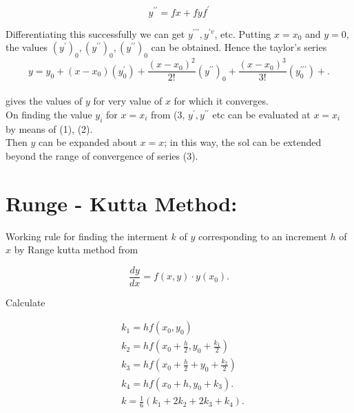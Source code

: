 \documentclass[12pt]{exam}
\begin{document}
\begin{equation*}
y^{\prime \prime}=f x+f y f^{\prime} \tag{2}
\end{equation*}


Differentiating this successfully we can get $y^{\prime \prime \prime}, y^{\prime v}$, etc. Putting $x=x_{0}$ and $y=0$, the values $\left(y^{\prime}\right)_{0},\left(y^{\prime \prime}\right)_{0},\left(y^{\prime \prime}\right)_{0}$ can be obtained. Hence the taylor's series\\


\begin{equation*}
y=y_{0}+\left(x-x_{0}\right)\left(y_{0}^{\prime}\right)+\frac{\left(x-x_{0}\right)^{2}}{2!}\left(y^{\prime \prime}\right)_{0}+\frac{\left(x-x_{0}\right)^{3}}{3!}\left(y_{0}^{\prime \prime \prime}\right)+. \tag{3}
\end{equation*}
\\[15pt]

gives the values of $y$ for very value of $x$ for which it converges.\\[15pt]
On finding the value $y_{i}$ for $x=x_{i}$ from (3, $y^{\prime}, y^{\prime \prime}$ etc can be evaluated at $x=x_{i}$ by means of (1), (2).\\[15pt]
Then $y$ can be expanded about $x=x$; in this way, the sol can be extended beyond the range of convergence of series (3).\\


\newpage


\section{Runge - Kutta Method:}
Working rule for finding the interment $k$ of $y$ corresponding to an increment $h$ of $x$ by Range kutta method from

$$
\frac{d y}{d x}=f(x, y) \cdot y\left(x_{0}\right) .
$$

Calculate

$$
\begin{aligned}
& k_{1}=h f\left(x_{0}, y_{0}\right) \\
& k_{2}=h f\left(x_{0}+\frac{h}{2}, y_{0}+\frac{k_{1}}{2}\right) \\
& k_{3}=h f\left(x_{0}+\frac{h}{2}+y_{0}+\frac{k_{2}}{2}\right) \\
& k_{4}=h f\left(x_{0}+h, y_{0}+k_{3}\right) . \\
& k=\frac{1}{6}\left(k_{1}+2 k_{2}+2 k_{3}+k_{4}\right) .
\end{aligned}
$$
\end{document}
